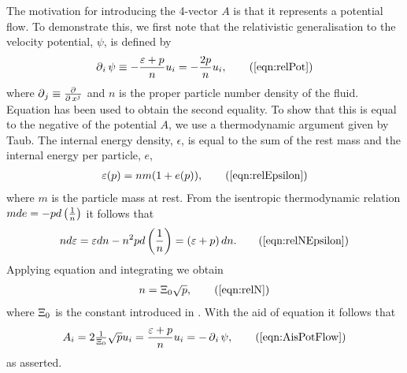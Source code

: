 The motivation for introducing the 4-vector $A$ is that it represents a potential flow.
To demonstrate this, we first note that the relativistic generalisation to the velocity potential, $\psi$,  is defined\cite{LandauBook} by
\begin{align}
  \d_i \psi \equiv - \frac{\epsilon+p}{n} u_i = - \frac{2 p}{n} u_i,
\tag{\ref{eqn:relPot}}
\end{align}
where $\operatorname{\partial}_j \equiv \frac{\operatorname{\partial}}{\operatorname{\partial} x^j}$ and  $n$ is the proper particle number density of the fluid.
Equation  has been used to obtain the second equality.
To show that this is equal to the negative of the potential $A$, we use a thermodynamic argument given by Taub\cite{Taub1978}.
The internal energy density, $\epsilon$, is equal to the sum of the rest mass and the internal energy per particle\cite{LandauBook, Taub1978}, $e$, 
\begin{align}
  \epsilon(p) = nm( 1 + e(p)),
\tag{\ref{eqn:relEpsilon}}
\end{align}
where $m$ is the particle mass at rest.
From the isentropic thermodynamic relation $m de = - p d\left( \frac{1}{n} \right)$
it follows that 
\begin{align}
 n d\epsilon = \epsilon dn - n^2 p d \lr{\frac{1}{n}} = \lr{\epsilon + p} dn.
\tag{\ref{eqn:relNEpsilon}}
\end{align}
Applying equation  and integrating we obtain
\begin{align}
n =\scalefactor \sqrt{   p },
\tag{\ref{eqn:relN}}
\end{align}
where $\Xi_0$ is the constant introduced in .
With the aid of equation  it follows that
\begin{align}
A_i = 2\tfrac{1}{\scalefactor}\sqrt p  u_i =\frac{\epsilon + p}{n} u_i =  -\d_i \psi,
\tag{\ref{eqn:AisPotFlow}}
\end{align}
as asserted.




